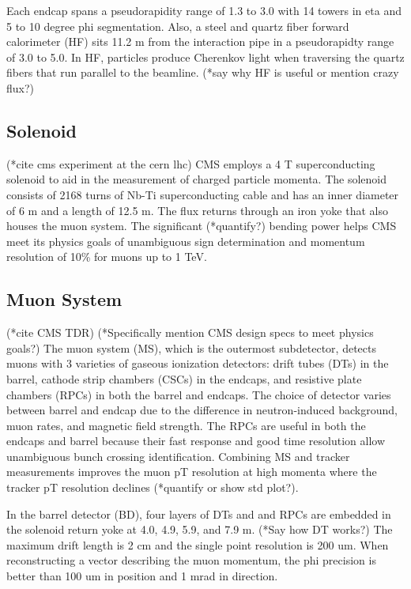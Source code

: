 \documentclass[12pt]{article}
\begin{document}
    Each endcap spans a pseudorapidity range of 1.3 to 3.0 with 14 towers in eta and 5 to 10 degree phi segmentation. Also, a steel and quartz fiber forward calorimeter (HF) sits 11.2 m from the interaction pipe in a pseudorapidty range of 3.0 to 5.0. In HF, particles produce Cherenkov light when traversing the quartz fibers that run parallel to the beamline. (*say why HF is useful or mention crazy flux?)

\subsection{Solenoid}
    (*cite cms experiment at the cern lhc)
    CMS employs a 4 T superconducting solenoid to aid in the measurement of charged particle momenta. The solenoid consists of 2168 turns of Nb-Ti superconducting cable and has an inner diameter of 6 m and a length of 12.5 m. The flux returns through an iron yoke that also houses the muon system. The significant (*quantify?) bending power helps CMS meet its physics goals of unambiguous sign determination and momentum resolution of 10\% for muons up to 1 TeV.

\subsection{Muon System}
    (*cite CMS TDR)
    (*Specifically mention CMS design specs to meet physics goals?)
    The muon system (MS), which is the outermost subdetector, detects muons with 3 varieties of gaseous ionization detectors: drift tubes (DTs) in the barrel, cathode strip chambers (CSCs) in the endcaps, and resistive plate chambers (RPCs) in both the barrel and endcaps. The choice of detector varies between barrel and endcap due to the difference in neutron-induced background, muon rates, and magnetic field strength. The RPCs are useful in both the endcaps and barrel because their fast response and good time resolution allow unambiguous bunch crossing identification. Combining MS and tracker measurements improves the muon pT resolution at high momenta where the tracker pT resolution declines (*quantify or show std plot?).

    In the barrel detector (BD), four layers of DTs and and RPCs are embedded in the solenoid return yoke at 4.0, 4.9, 5.9, and 7.9 m. (*Say how DT works?) The maximum drift length is 2 cm and the single point resolution is 200 um. When reconstructing a vector describing the muon momentum, the phi precision is better than 100 um in position and 1 mrad in direction. 
\end{document}
